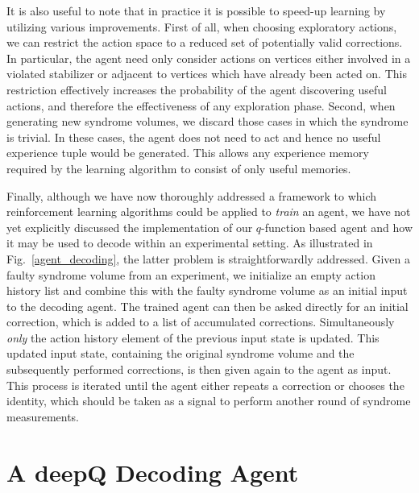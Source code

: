 \documentclass[twocolumn,preprintnumbers,amsmath,amssymb,notitlepage,nofootinbib,longbibliography,superscriptaddress,aps,pra,10pt]{revtex4-1}
\begin{document}
	It is also useful to note that in practice it is possible to speed-up learning by utilizing various improvements.
	First of all, when choosing exploratory actions, we can restrict the action space to a reduced set of potentially valid corrections.
	In particular, the agent need only consider actions on vertices either involved in a violated stabilizer or adjacent to vertices which have already been acted on.
	This restriction effectively increases the probability of the agent discovering useful actions, and therefore the effectiveness of any exploration phase.
	Second, when generating new syndrome volumes, we discard those cases in which the syndrome is trivial.
	In these cases, the agent does not need to act and hence no useful experience tuple would be generated.
	This allows any experience memory required by the learning algorithm to consist of only useful memories.

	Finally, although we have now thoroughly addressed a framework to which reinforcement learning algorithms could be applied to \textit{train} an agent, we have not yet explicitly discussed the implementation of our $q$-function based agent and how it may be used to decode within an experimental setting.
	As illustrated in Fig.~\ref{agent_decoding}, the latter problem is straightforwardly addressed.
	Given a faulty syndrome volume from an experiment, we initialize an empty action history list and combine this with the faulty syndrome volume as an initial input to the decoding agent.
	The trained agent can then be asked directly for an initial correction, which is added to a list of accumulated corrections.
	Simultaneously \textit{only} the action history element of the previous input state is updated.
	This updated input state, containing the original syndrome volume and the subsequently performed corrections, is then given again to the agent as input.
	This process is iterated until the agent either repeats a correction or chooses the identity, which should be taken as a signal to perform another round of syndrome measurements.

\section{A deepQ Decoding Agent}\label{s:dq_agent}
\end{document}
